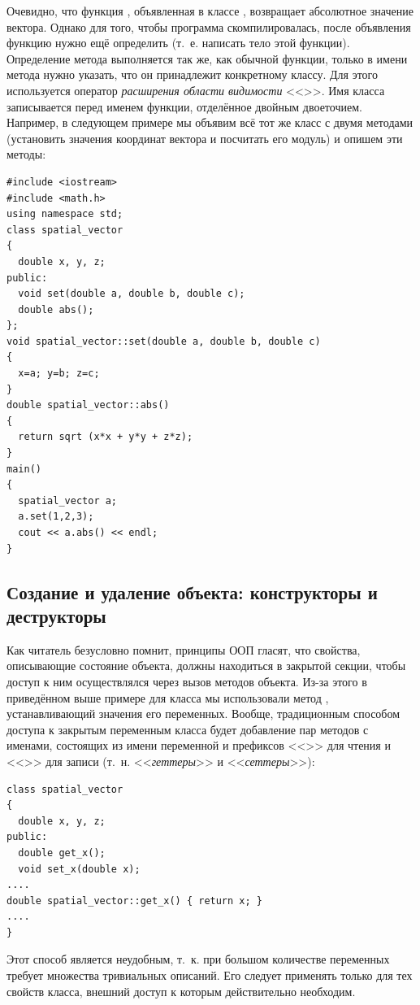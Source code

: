 Очевидно, что функция , объявленная в классе ,
возвращает абсолютное значение вектора. Однако для того, чтобы программа скомпилировалась, после объявления функцию
 нужно ещё определить (т.~е. написать тело этой функции). Определение метода выполняется так
же, как обычной функции, только в имени метода нужно указать, что он принадлежит конкретному классу. Для этого
используется оператор \emph{расширения области видимости} <<\Sys{::}>>. Имя класса
записывается перед именем функции, отделённое двойным двоеточием. Например, в следующем примере мы объявим всё тот же
класс  с двумя методами (установить значения координат вектора и посчитать его
модуль) и опишем эти методы:
\begin{lstlisting}
#include <iostream>
#include <math.h>
using namespace std;
class spatial_vector 
{
  double x, y, z;
public:
  void set(double a, double b, double c);
  double abs();
};
void spatial_vector::set(double a, double b, double c) 
{
  x=a; y=b; z=c;
}
double spatial_vector::abs() 
{
  return sqrt (x*x + y*y + z*z);
}
main() 
{
  spatial_vector a;
  a.set(1,2,3); 
  cout << a.abs() << endl;
}
\end{lstlisting}

\subsection[Создание и удаление объекта: конструкторы и деструкторы]{Создание и удаление объекта: конструкторы и
деструкторы}
Как читатель безусловно помнит, принципы ООП гласят, что свойства, описывающие состояние объекта, должны находиться в
закрытой секции, чтобы доступ к ним осуществлялся через вызов методов объекта. Из-за этого в приведённом выше примере
для класса  мы использовали метод , устанавливающий
значения его переменных. Вообще, традиционным способом доступа к закрытым переменным класса будет добавление пар
методов с именами, состоящих из имени переменной и префиксов <<>> для чтения и
<<>> для записи (т.~н. <<\emph{геттеры}>> и <<\emph{сеттеры}>>):
\begin{lstlisting}
class spatial_vector 
{
  double x, y, z;
public:
  double get_x();
  void set_x(double x);
....
double spatial_vector::get_x() { return x; }
....
}
\end{lstlisting}

Этот способ является неудобным, т.~к. при большом количестве переменных требует множества тривиальных описаний. Его
следует применять только для тех свойств класса, внешний доступ к которым действительно необходим.

